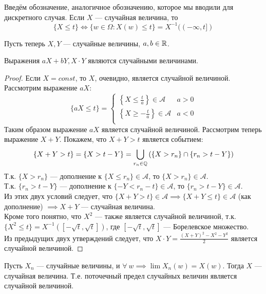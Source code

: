 \begin{designation}
    Введём обозначение, аналогичное обозначению, которое мы вводили для дискретного случая. Если $X$ --- случайная
    величина, то
    \[
        \{X \leq t\} \iff \{w \in \Omega \colon X(w) \leq t\} = X^{-1}((-\infty, t])
    \]
\end{designation}

Пусть теперь $X, Y$ --- случайные величины, $a, b \in \mathbb{R}$.

\begin{proposal}
    Выражения $aX + bY, X \cdot Y$ являются случайными величинами.
\end{proposal}
\begin{proof}
    Если $X = const$, то $X$, очевидно, является случайной величиной. Рассмотрим выражение $aX$:
    \[
        \{aX \leq t\} =
        \begin{cases}
            \left\{ X \leq \frac{t}{a} \right\} \in \mathcal{A} & a > 0\\
            \left\{ X \geq -\frac{t}{a} \right\} \in \mathcal{A} & a < 0\\
        \end{cases}
    \]
    Таким образом выражение $aX$ является случайной величиной. Рассмотрим теперь выражение $X + Y$. Покажем, что
    $X + Y > t$ является событием:
    \[
        \{X + Y > t\} = \{X > t - Y\} = \bigcup_{r_n \in \mathbb{Q}} \left( \{X > r_n\} \cap \{r_n > t - Y\} \right)
    \]
    Т.к. $\{X > r_n\}$ --- дополнение к $\{X \leq r_n\} \in \mathcal{A}$, то $\{X > r_n\} \in \mathcal{A}$.\\
    Т.к. $\{r_n > t - Y\}$ --- дополнение к $\{-Y < r_n - t\} \in \mathcal{A}$, то $\{r_n > t - Y\} \in \mathcal{A}$.\\
    Из этих двух условий следует, что $\{X + Y > t\} \in \mathcal{A} \implies \{X + Y \leq t\} \in \mathcal{A}$
    (как дополнение) $\implies X + Y$ --- случайная величина.\\
    Кроме того понятно, что $X^2$ --- также является случайной величиной, т.к. $\{X^2 \leq t\} =
    X^{-1}([-\sqrt{t}, \sqrt{t}])$, где $[-\sqrt{t}, \sqrt{t}]$ --- Борелевское множество.\\
    Из предыдущих двух утверждений следует, что $X \cdot Y = \frac{(X + Y)^2 - X^2 - Y^2}{2}$ является случайной величиной.
\end{proof}
\begin{proposal}
    Пусть $X_n$ --- случайные величины, и $\forall ~ w \implies \lim X_n(w) = X(w)$. Тогда $X$ --- случайная величина.
    Т.е. поточечный предел случайных величин является случайной величиной.
\end{proposal}
